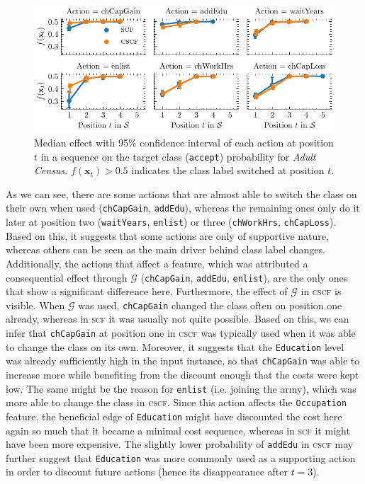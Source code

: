 \documentclass[runningheads, envcountsame, a4paper]{llncs}
\newcommand{\ours}{\textsc{cscf}}
\newcommand{\oursShort}{\ours}
\newcommand{\mainEA}{\oursShort}
\newcommand{\alternativeEA}{\textsc{scf}}
\newcommand{\adultDataset}{\emph{Adult Census}}
\newcommand{\state}{\mathbf{x}}
\newcommand{\targetclass}{\texttt{accept}}
\newcommand{\blackbox}{f}
\newcommand{\dependencyGraph}{\mathcal{G}}
\begin{document}
\begin{figure}[!ht]
    \centering
    \includegraphics[width=\textwidth]{figures/adult_probabilities.pdf}
    \caption{Median effect with 95\% confidence interval of each action at position $t$ in a sequence on the target class (\targetclass{}) probability for \adultDataset{}. $\blackbox(\state_t) > 0.5$ indicates the class label switched at position $t$.}
    \label{fig:adult_probabilities}
\end{figure}

As we can see, there are some actions that are almost able to switch the class on their own when used (\texttt{chCapGain}, \texttt{addEdu}), whereas the remaining ones only do it later at position two (\texttt{waitYears}, \texttt{enlist}) or three (\texttt{chWorkHrs}, \texttt{chCapLoss}). 
Based on this, it suggests that some actions are only of supportive nature, whereas others can be seen as the main driver behind class label changes.
Additionally, the actions that affect a feature, which was attributed a consequential effect through $\dependencyGraph$ (\texttt{chCapGain}, \texttt{addEdu}, \texttt{enlist}), are the only ones that show a significant difference here. 
Furthermore, the effect of $\dependencyGraph$ in \mainEA{} is visible. When $\dependencyGraph$ was used, \texttt{chCapGain} changed the class often on position one already, whereas in \alternativeEA{} it was usually not quite possible. Based on this, we can infer that \texttt{chCapGain} at position one in \mainEA{} was typically used when it was able to change the class on its own.
Moreover, it suggests that the \texttt{Education} level was already sufficiently high in the input instance, so that \texttt{chCapGain} was able to increase more while benefiting from the discount enough that the costs were kept low.
The same might be the reason for \texttt{enlist} (i.e. joining the army), which was more able to change the class in \mainEA{}. Since this action affects the \texttt{Occupation} feature, the beneficial edge of \texttt{Education} might have discounted the cost here again so much that it became a minimal cost sequence, whereas in \alternativeEA{} it might have been more expensive. The slightly lower probability of \texttt{addEdu} in \mainEA{} may further suggest that \texttt{Education} was more commonly used as a supporting action in order to discount future actions (hence its disappearance after $t=3$).
\end{document}
